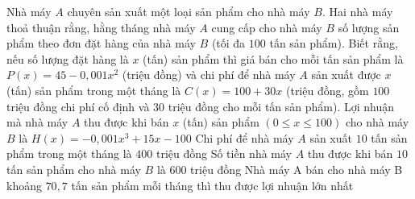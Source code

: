 	\begin{ex}%
		Nhà máy $A$ chuyên sản xuất một loại sản phẩm cho nhà máy $B$. Hai nhà máy thoả thuận rằng, hằng tháng nhà máy $A$ cung cấp cho nhà máy $B$ số lượng sản phẩm theo đơn đặt hàng của nhà máy $B$ (tối đa $100$ tấn sản phẩm).
		Biết rằng, nếu số lượng đặt hàng là $x$ (tấn) sản phẩm thì giá bán cho mỗi tấn sản phẩm là $P(x)=45-0{,}001x^2$ (triệu đồng) và chi phí để nhà máy $A$ sản xuất được $x$ (tấn) sản phẩm trong một tháng là $C(x)=100+30x$ (triệu đồng, gồm $100$ triệu đồng chi phí cố định và $30$ triệu đồng cho mỗi tấn sản phẩm).
		\choiceTF
		{\True Lợi nhuận mà nhà máy $A$ thu được khi bán $x$ (tấn) sản phẩm $(0\le x\le 100)$ cho nhà máy $B$ là $H(x)=-0{,}001x^3+15x-100$}
		{\True Chi phí để nhà máy $A$ sản xuất $10$ tấn sản phẩm trong một tháng là $400$ triệu đồng}
		{Số tiền nhà máy $A$ thu được khi bán $10$ tấn sản phẩm cho nhà máy $B$ là $600$ triệu đồng}
		{\True Nhà máy A bán cho nhà máy B khoảng $70{,}7$ tấn sản phẩm mỗi tháng thì thu được lợi nhuận lớn nhất}
	\end{ex}
	

